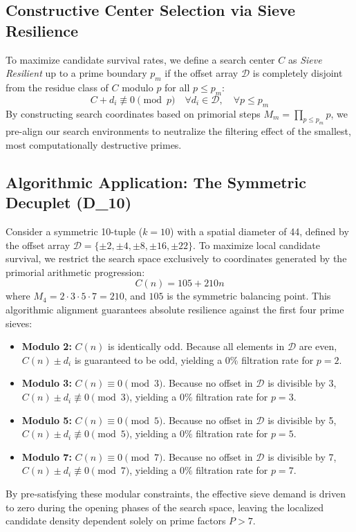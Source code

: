 \documentclass[sn-mathphys-num, pdflatex]{sn-jnl}
\begin{document}
\subsection{Constructive Center Selection via Sieve Resilience}
To maximize candidate survival rates, we define a search center $C$ as \textit{Sieve Resilient} up to a prime boundary $p_m$ if the offset array $\mathcal{D}$ is completely disjoint from the residue class of $C$ modulo $p$ for all $p \le p_m$:
\begin{equation}
    C + d_i \not\equiv 0 \pmod p \quad \forall d_i \in \mathcal{D}, \quad \forall p \le p_m
\end{equation}
By constructing search coordinates based on primorial steps $M_m = \prod_{p \le p_m} p$, we pre-align our search environments to neutralize the filtering effect of the smallest, most computationally destructive primes.

\subsection{Algorithmic Application: The Symmetric Decuplet (D\_{10})}
Consider a symmetric 10-tuple ($k=10$) with a spatial diameter of 44, defined by the offset array $\mathcal{D} = \{\pm 2, \pm 4, \pm 8, \pm 16, \pm 22\}$. To maximize local candidate survival, we restrict the search space exclusively to coordinates generated by the primorial arithmetic progression:
\begin{equation}
    C(n) = 105 + 210n
\end{equation}
where $M_4 = 2 \cdot 3 \cdot 5 \cdot 7 = 210$, and $105$ is the symmetric balancing point. This algorithmic alignment guarantees absolute resilience against the first four prime sieves:
\begin{itemize}
    \item \textbf{Modulo 2:} $C(n)$ is identically odd. Because all elements in $\mathcal{D}$ are even, $C(n) \pm d_i$ is guaranteed to be odd, yielding a $0\%$ filtration rate for $p=2$.
    \item \textbf{Modulo 3:} $C(n) \equiv 0 \pmod 3$. Because no offset in $\mathcal{D}$ is divisible by 3, $C(n) \pm d_i \not\equiv 0 \pmod 3$, yielding a $0\%$ filtration rate for $p=3$.
    \item \textbf{Modulo 5:} $C(n) \equiv 0 \pmod 5$. Because no offset in $\mathcal{D}$ is divisible by 5, $C(n) \pm d_i \not\equiv 0 \pmod 5$, yielding a $0\%$ filtration rate for $p=5$.
    \item \textbf{Modulo 7:} $C(n) \equiv 0 \pmod 7$. Because no offset in $\mathcal{D}$ is divisible by 7, $C(n) \pm d_i \not\equiv 0 \pmod 7$, yielding a $0\%$ filtration rate for $p=7$.
\end{itemize}
By pre-satisfying these modular constraints, the effective sieve demand is driven to zero during the opening phases of the search space, leaving the localized candidate density dependent solely on prime factors $P > 7$.
\end{document}
